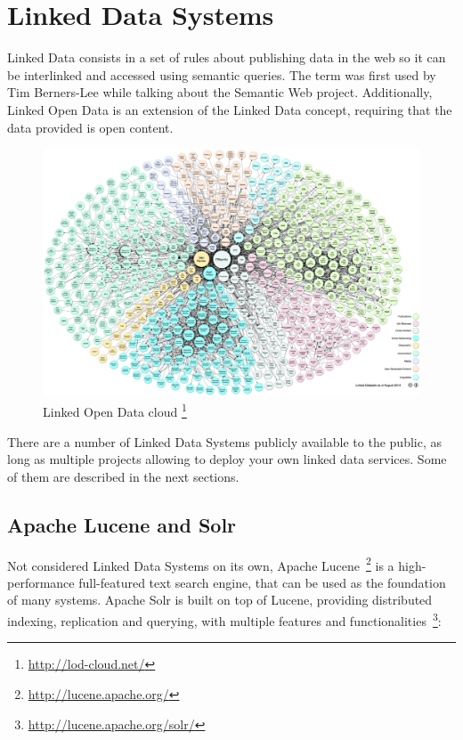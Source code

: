 
\section{Linked Data Systems}
\label{sec:linkd_sys}

Linked Data consists in a set of rules about publishing data in the web so it can be interlinked and accessed using semantic queries. The term was first used by Tim Berners-Lee while talking about the Semantic Web project. Additionally, Linked Open Data is an extension of the Linked Data concept, requiring that the data provided is open content.

\begin{figure}[!htbp]
  \begin{minipage}{\linewidth}
    \centering
    \includegraphics[width=\textwidth]{img/enabling/lod-cloud.png}
    \caption[Linked Open Data cloud]{%
      Linked Open Data cloud%
      \footnote{\url{http://lod-cloud.net/}}%
      }
    \label{fig:lodcloud}
  \end{minipage}
\end{figure}

There are a number of Linked Data Systems publicly available to the public, as long as multiple projects allowing to deploy your own linked data services. Some of them are described in the next sections. 

\subsection{Apache Lucene and Solr}
\label{sec:statesolr}

Not considered Linked Data Systems on its own, Apache Lucene~\footnote{\url{http://lucene.apache.org/}} is a high-performance full-featured text search engine, that can be used as the foundation of many systems. Apache Solr is built on top of Lucene, providing distributed indexing, replication and querying, with multiple features and functionalities~\footnote{\url{http://lucene.apache.org/solr/}}:

